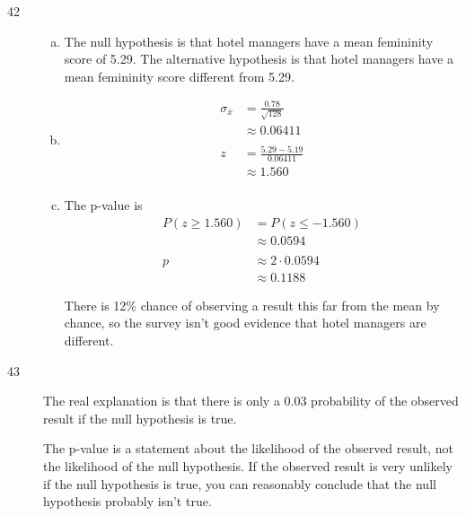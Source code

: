\documentclass[letterpaper, landscape]{exam}
\begin{document}
\begin{description}
\begin{enumerate}[(a)]
        \end{enumerate}

      \item[42]
        \begin{enumerate}[(a)]
          \item The null hypothesis is that hotel managers have a mean
            femininity score of 5.29. The alternative hypothesis is that hotel
            managers have a mean femininity score different from 5.29.

          \item
            \begin{align*}
              \sigma_{\bar{x}} & = \frac{0.78}{\sqrt{128}} \\
                               & \approx 0.06411 \\
              \\
              z & = \frac{5.29 - 5.19}{0.06411} \\
                & \approx \boxed{ 1.560 } \\
            \end{align*}

          \item The p-value is 
            \begin{align*}
              P(z \geq 1.560) & = P(z \leq -1.560) \\
                              & \approx 0.0594 \\
              \\
              p & \approx 2 \cdot 0.0594 \\
                & \approx \boxed{ 0.1188 }
            \end{align*}

            There is 12\% chance of observing a result this far from the mean by
            chance, so the survey isn't good evidence that hotel managers are
            different.

        \end{enumerate}

      \item[43] The real explanation is that there is only a 0.03 probability of
        the observed result if the null hypothesis is true. 
        
        The p-value is a statement about the likelihood of the observed result,
        not the likelihood of the null hypothesis. If the observed result is
        very unlikely if the null hypothesis is true, you can reasonably
        conclude that the null hypothesis probably isn't true.


\end{description}
\end{document}
